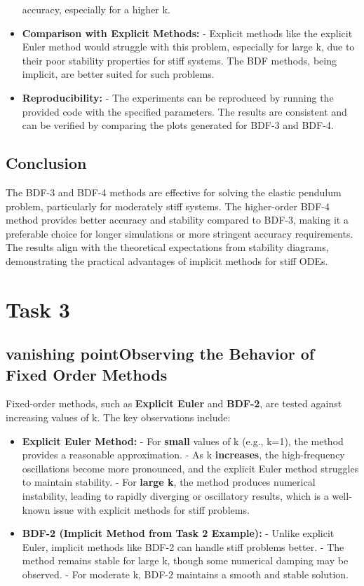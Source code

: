\documentclass{article}
\begin{document}
\begin{itemize}
    accuracy, especially for a higher k.
    \item \textbf{Comparison with Explicit Methods:}
    \subitem - Explicit methods like the explicit Euler method would struggle with this problem, especially for large k,
    due to their poor stability properties for stiff systems. The BDF methods, being implicit, are better suited for such
    problems.
    \item \textbf{Reproducibility:}
    \subitem - The experiments can be reproduced by running the provided code with the specified parameters. The results
    are consistent and can be verified by comparing the plots generated for BDF-3 and BDF-4.
\end{itemize}

\subsection{\textbf{Conclusion}}

The BDF-3 and BDF-4 methods are effective for solving the elastic pendulum problem, particularly for moderately stiff
systems.
The higher-order BDF-4 method provides better accuracy and stability compared to BDF-3, making it a preferable choice
for longer simulations or more stringent accuracy requirements.
The results align with the theoretical expectations from stability diagrams, demonstrating the practical advantages of
implicit methods for stiff ODEs.

\section{Task 3}

\subsection{\textbf{vanishing pointObserving the Behavior of Fixed Order Methods}}

Fixed-order methods, such as \textbf{Explicit Euler} and \textbf{BDF-2}, are tested against increasing values of k. The key observations include:

\begin{itemize}
    \item \textbf{Explicit Euler Method:}
    \subitem - For \textbf{small} values of k (e.g., k=1), the method provides a reasonable approximation.
    \subitem - As k \textbf{increases}, the high-frequency oscillations become more pronounced, and the explicit Euler method struggles to maintain stability.
    \subitem - For \textbf{large k}, the method produces numerical instability, leading to rapidly diverging or oscillatory results, which is a well-known issue with explicit methods for stiff problems.
    \item \textbf{BDF-2 (Implicit Method from Task 2 Example):}
    \subitem - Unlike explicit Euler, implicit methods like BDF-2 can handle stiff problems better.
    \subitem - The method remains stable for large k, though some numerical damping may be observed.
    \subitem - For moderate k, BDF-2 maintains a smooth and stable solution.
\end{itemize}
\end{document}
